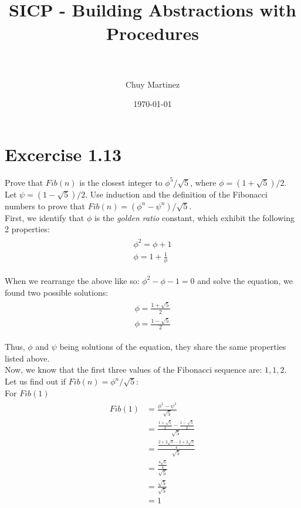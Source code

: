 \documentclass[paper=a4, fontsize=11pt]{scrartcl} %
\title{	
\normalfont \normalsize 
\horrule{0.5pt} \\[0.4cm] %
\huge SICP - Building Abstractions with Procedures \\ %
\horrule{2pt} \\[0.5cm] %
}
\author{Chuy Martinez} %
\date{\normalsize\today} %
\numberwithin{equation}{section} %
\numberwithin{figure}{section} %
\numberwithin{table}{section} %
\begin{document}
\maketitle


\section{Excercise 1.13}

Prove that $Fib(n)$ is the closest integer to $\phi^5 / \sqrt5$, where $\phi = (1 + \sqrt5) / 2$. Let $\psi = (1 - \sqrt5) / 2$. Use induction and the definition of the Fibonacci numbers to prove that $Fib(n) = (\phi^n - \psi^n)/\sqrt 5$.\\

First, we identify that $\phi$ is the \emph{golden ratio} constant, which exhibit the following 2 properties:\\
\begin{align}
  \begin{split}
    \phi^2=\phi+1\\
    \phi=1 + \frac{1}{\phi}
  \end{split}
\end{align}

When we rearrange the above like so: $\phi^2-\phi-1=0$ and solve the equation, we found two possible solutions:\\

\begin{align}
  \begin{split}
    \phi=\frac{1+\sqrt5}{2}\\
    \phi=\frac{1-\sqrt5}{2}
  \end{split}
\end{align}

Thus, $\phi$ and $\psi$ being solutions of the equation, they share the same properties listed above.\\

Now, we know that the first three values of the Fibonacci sequence are: ${1,1,2}$. Let us find out if $Fib(n)=\phi^n/\sqrt5$:\\

For $Fib(1)$
\begin{align}
  \begin{split}
    Fib(1) &=\frac{\phi^1 - \psi^1}{\sqrt5}\\
    &= \frac{\frac{1+\sqrt5}{2}-\frac{1-\sqrt5}{2}}{\sqrt5}\\
    &= \frac{\frac{2+2\sqrt5-2+2\sqrt5}{4}}{\sqrt5}\\
    &= \frac{\frac{4\sqrt5}{4}}{\sqrt5}\\
    &= \frac{\sqrt5}{\sqrt5}\\
    &= 1\\
  \end{split}
\end{align}
\end{document}
